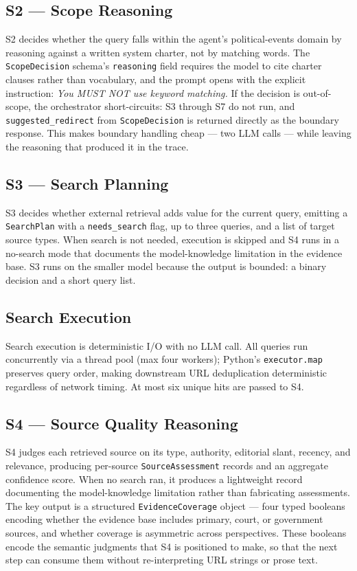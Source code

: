 \documentclass[11pt,letterpaper]{article}
\newcommand{\code}[1]{\texttt{\small #1}}
\begin{document}
\subsection{S2 --- Scope Reasoning}

S2 decides whether the query falls within the agent's political-events domain
by reasoning against a written system charter, not by matching words. The
\code{ScopeDecision} schema's \code{reasoning} field requires the model to
cite charter clauses rather than vocabulary, and the prompt opens with the
explicit instruction: \textit{You MUST NOT use keyword matching.} If the
decision is out-of-scope, the orchestrator short-circuits: S3 through S7 do
not run, and \code{suggested\_redirect} from \code{ScopeDecision} is returned
directly as the boundary response. This makes boundary handling cheap --- two
LLM calls --- while leaving the reasoning that produced it in the trace.

\subsection{S3 --- Search Planning}

S3 decides whether external retrieval adds value for the current query, emitting
a \code{SearchPlan} with a \code{needs\_search} flag, up to three queries, and
a list of target source types. When search is not needed, execution is skipped
and S4 runs in a no-search mode that documents the model-knowledge limitation
in the evidence base. S3 runs on the smaller model because the output is
bounded: a binary decision and a short query list.

\subsection{Search Execution}

Search execution is deterministic I/O with no LLM call. All queries run
concurrently via a thread pool (max four workers); Python's \code{executor.map}
preserves query order, making downstream URL deduplication deterministic
regardless of network timing. At most six unique hits are passed to S4.

\subsection{S4 --- Source Quality Reasoning}

S4 judges each retrieved source on its type, authority, editorial slant,
recency, and relevance, producing per-source \code{SourceAssessment} records
and an aggregate confidence score. When no search ran, it produces a
lightweight record documenting the model-knowledge limitation rather than
fabricating assessments. The key output is a structured
\code{EvidenceCoverage} object --- four typed booleans encoding whether the
evidence base includes primary, court, or government sources, and whether
coverage is asymmetric across perspectives. These booleans encode the semantic
judgments that S4 is positioned to make, so that the next step can consume
them without re-interpreting URL strings or prose text.
\end{document}
